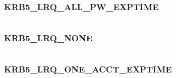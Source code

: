 \documentclass[letterpaper,10pt,english]{sphinxmanual}
\begin{document}
\begin{tabulary}{\linewidth}{|L|L|}
\hline

 & 
\\\hline
\end{tabulary}



\subsubsection{KRB5\_LRQ\_ALL\_PW\_EXPTIME}
\label{appdev/refs/macros/KRB5_LRQ_ALL_PW_EXPTIME:krb5-lrq-all-pw-exptime-data}\label{appdev/refs/macros/KRB5_LRQ_ALL_PW_EXPTIME::doc}\label{appdev/refs/macros/KRB5_LRQ_ALL_PW_EXPTIME:krb5-lrq-all-pw-exptime}

\begin{fulllineitems}
\label{appdev/refs/macros/KRB5_LRQ_ALL_PW_EXPTIME:KRB5_LRQ_ALL_PW_EXPTIME}
\end{fulllineitems}


\begin{tabulary}{\linewidth}{|L|L|}
\hline

 & 
\\\hline
\end{tabulary}



\subsubsection{KRB5\_LRQ\_NONE}
\label{appdev/refs/macros/KRB5_LRQ_NONE:krb5-lrq-none-data}\label{appdev/refs/macros/KRB5_LRQ_NONE::doc}\label{appdev/refs/macros/KRB5_LRQ_NONE:krb5-lrq-none}

\begin{fulllineitems}
\label{appdev/refs/macros/KRB5_LRQ_NONE:KRB5_LRQ_NONE}
\end{fulllineitems}


\begin{tabulary}{\linewidth}{|L|L|}
\hline

 & 
\\\hline
\end{tabulary}



\subsubsection{KRB5\_LRQ\_ONE\_ACCT\_EXPTIME}
\label{appdev/refs/macros/KRB5_LRQ_ONE_ACCT_EXPTIME::doc}\label{appdev/refs/macros/KRB5_LRQ_ONE_ACCT_EXPTIME:krb5-lrq-one-acct-exptime}\label{appdev/refs/macros/KRB5_LRQ_ONE_ACCT_EXPTIME:krb5-lrq-one-acct-exptime-data}
\end{document}
